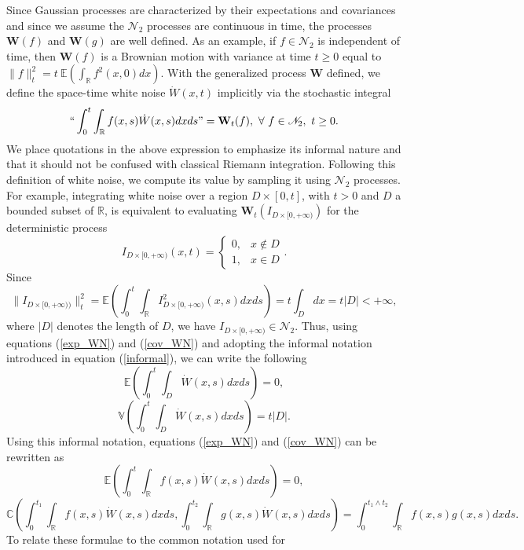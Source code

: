 \documentclass[]{article}
\begin{document}
Since Gaussian processes are characterized by their expectations and
covariances and since we assume the \(\mathscr{N}_2\) processes are
continuous in time, the processes \(\mathbf W(f)\) and \(\mathbf W(g)\)
are well defined. As an example, if \(f\in\mathscr{N}_2\) is independent
of time, then \(\mathbf W(f)\) is a Brownian motion with variance at
time \(t\geq0\) equal to
\(\|f\|_t^2=t \ \mathbb{E}(\int_\mathbb{R}f^2(x,0)dx)\). With the
generalized process \(\mathbf W\) defined, we define the space-time
white noise \(\dot W(x,t)\) implicitly via the stochastic integral
\begin{equation}\label{informal}
``\int_0^t\int_\mathbb{R}f(x,s)\dot W(x,s)dxds"=\mathbf W_t(f), \ \forall \ f\in\mathscr{N}_2, \ t\geq0.
\end{equation} We place quotations in the above expression to emphasize
its informal nature and that it should not be confused with classical
Riemann integration. Following this definition of white noise, we
compute its value by sampling it using \(\mathscr{N}_2\) processes. For
example, integrating white noise over a region \(D\times[0,t]\), with
\(t>0\) and \(D\) a bounded subset of \(\mathbb{R}\), is equivalent to
evaluating \(\mathbf W_t(I_{D\times [0,+\infty)})\) for the
deterministic process \begin{equation}
I_{D\times [0,+\infty)}(x,t)=\left\{\begin{matrix}
0, & x\notin D \\
1, & x\in D
\end{matrix}\right..
\end{equation} Since \begin{equation}
\|I_{D\times[0,+\infty))}\|_t^2=\mathbb{E}\left(\int_0^t\int_\mathbb{R}I_{D\times [0,+\infty)}^2(x,s)dxds\right)=t\int_Ddx=t|D|<+\infty, 
\end{equation} where \(|D|\) denotes the length of \(D\), we have
\(I_{D\times [0,+\infty)}\in\mathscr{N}_2\). Thus, using equations
(\ref{exp_WN}) and (\ref{cov_WN}) and adopting the informal notation
introduced in equation (\ref{informal}), we can write the following
\begin{equation}
\mathbb{E}\left(\int_0^t\int_D\dot W(x,s)dxds\right)=0,
\end{equation} \begin{equation}
\mathbb{V}\left(\int_0^t\int_D\dot W(x,s)dxds\right)=t|D|.
\end{equation} Using this informal notation, equations (\ref{exp_WN})
and (\ref{cov_WN}) can be rewritten as \begin{equation}\label{exp_WN_xi}
\mathbb{E}\left(\int_0^t\int_\mathbb{R}f(x,s)\dot W(x,s)dxds\right)=0,
\end{equation} \begin{equation}\label{cov_WN_xi}
\mathbb{C}\left(\int_0^{t_1}\int_\mathbb{R}f(x,s)\dot W(x,s)dxds,\int_0^{t_2}\int_\mathbb{R}g(x,s)\dot W(x,s)dxds\right)
=\int_0^{t_1\wedge t_2}\int_\mathbb{R}f(x,s)g(x,s)dxds.
\end{equation} To relate these formulae to the common notation used for
\end{document}
